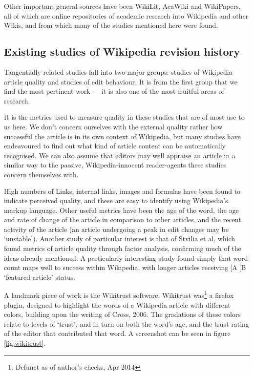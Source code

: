 Other important general sources have been WikiLit,\cite{wikilit}
AcaWiki\cite{acawiki} and WikiPapers\cite{wikipapers}, all of which
are online repositories of academic research into Wikipedia and other
Wikis, and from which many of the studies mentioned here were found.


\subsection*{Existing studies of Wikipedia revision history}
Tangentially related studies fall into two major groups: studies of
Wikipedia article quality and studies of edit behaviour.  It is from
the first group that we find the most pertinent work --- it is also
one of the most fruitful areas of research.

It is the metrics used to measure quality in these studies that are of
most use to us here. We don't concern ourselves with the external
quality rather how successful the article is in its own context of
Wikipedia, but many studies have endeavoured to find out what kind of
article content can be automatically recognised. We can also assume
that editors may well appraise an article in a similar way to the
passive, Wikipedia-innocent reader-agents these studies concern
themselves with.

High numbers of Links, internal links, images and formulas have been
found to indicate perceived
quality,\cite{Lucassen2010}\cite{mcguinness2006} and these are easy to
identify using Wikipedia's markup language. Other useful metrics have
been the age of the word,\cite{Cross2006} the age and rate of change
of the article in comparison to other articles,\cite{Zeng2006} and the
recent activity of the article (an article undergoing a peak in edit
changes may be `unstable').\cite{Adler2006} Another study of
particular interest is that of Stvilia et al, which found metrics of
article quality through factor analysis,\cite{Stvilia2005} confirming
much of the ideas already mentioned. A particularly interesting study
found simply that word count maps well to success within Wikipedia,
with longer articles receiving[A[B `featured article'
status.\cite{blumenstock2008size}

A landmark piece of work is the Wikitrust software.\cite{Adler2007}
Wikitrust was\footnote{Defunct as of author's checks, Apr 2014} a
firefox plugin, designed to highlight the words of a Wikipedia article
with different colors, building upon the writing of Cross,
2006.\cite{Cross2006} The gradations of these colors relate to levels
of `trust', and in turn on both the word's age, and the trust rating
of the editor that contributed that word. A screenshot can be seen in
figure \ref{fig:wikitrust}. 

